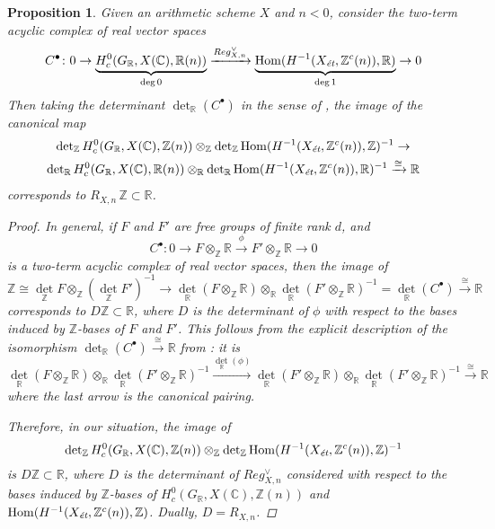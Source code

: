 \documentclass[draft]{article}
\DeclareMathOperator{\Hom}{Hom}
\newcommand{\CC}{\mathbb{C}}
\newcommand{\RR}{\mathbb{R}}
\newcommand{\ZZ}{\mathbb{Z}}
\renewcommand{\det}{\operatorname{det}}
\newcommand{\et}{\text{\it \'{e}t}}
\theoremstyle{myplain}
\newtheorem{proposition}[theorem]{Proposition}
\theoremstyle{mydefinition}
\numberwithin{equation}{section}
\begin{document}
\begin{proposition}
  \label{prop:trivialization-of-free-part}
  Given an arithmetic scheme $X$ and $n < 0$, consider the two-term acyclic
  complex of real vector spaces
  \[ C^\bullet\colon
    0 \to
    \underbrace{H^0_c (G_\RR, X(\CC), \RR(n))}_{\deg 0}
    \xrightarrow{Reg_{X,n}^\vee}
    \underbrace{\Hom (H^{-1} (X_\et, \ZZ^c (n)), \RR)}_{\deg 1}
    \to 0 \]
  Then taking the determinant $\det_\RR (C^\bullet)$ in the sense of
  \cite{Knudsen-Mumford-1976}, the image of the canonical map
  \begin{multline*}
    \det_\ZZ H^0_c (G_\RR, X(\CC), \ZZ(n)) \otimes_\ZZ
    \det_\ZZ \Hom (H^{-1} (X_\et, \ZZ^c (n)), \ZZ)^{-1} \to \\
    \det_\RR H^0_c (G_\RR, X(\CC), \RR (n)) \otimes_\RR
    \det_\RR \Hom (H^{-1} (X_\et, \ZZ^c (n)), \RR)^{-1}
    \xrightarrow{\cong} \RR
  \end{multline*}
  corresponds to $R_{X,n}\,\ZZ \subset \RR$.

  \begin{proof}
    In general, if $F$ and $F'$ are free groups of finite rank $d$, and
    $$C^\bullet\colon 0 \to F\otimes_\ZZ \RR \xrightarrow{\phi} F'\otimes_\ZZ \RR \to 0$$
    is a two-term acyclic complex of real vector spaces, then the image of
    \[ \ZZ \cong \det_\ZZ F \otimes_\ZZ (\det_\ZZ F')^{-1} \to
      \det_\RR (F\otimes_\ZZ \RR) \otimes_\RR \det_\RR (F' \otimes_\ZZ \RR)^{-1}
      = \det_\RR (C^\bullet) \xrightarrow{\cong} \RR \]
    corresponds to $D\ZZ \subset \RR$, where $D$ is the determinant of $\phi$ with
    respect to the bases induced by $\ZZ$-bases of $F$ and $F'$.
    This follows from the explicit description of the isomorphism
    $\det_\RR (C^\bullet) \xrightarrow{\cong} \RR$ from
    \cite[p.\,33]{Knudsen-Mumford-1976}: it is
    \[ \det_\RR (F \otimes_\ZZ \RR) \otimes_\RR
      \det_\RR (F'\otimes_\ZZ \RR)^{-1} \xrightarrow{\det_\RR (\phi)}
      \det_\RR (F' \otimes_\ZZ \RR) \otimes_\RR
      \det_\RR (F' \otimes_\ZZ \RR)^{-1} \xrightarrow{\cong} \RR \]
    where the last arrow is the canonical pairing.

    Therefore, in our situation, the image of
    \[ \det_\ZZ H^0_c (G_\RR, X(\CC), \ZZ(n)) \otimes_\ZZ
      \det_\ZZ \Hom (H^{-1} (X_\et, \ZZ^c (n)), \ZZ)^{-1} \]
    is $D \ZZ \subset \RR$, where $D$ is the determinant of $Reg_{X,n}^\vee$
    considered with respect to the bases induced by $\ZZ$-bases of
    $H^0_c (G_\RR, X(\CC), \ZZ(n))$ and
    $\Hom (H^{-1} (X_\et, \ZZ^c (n)), \ZZ)$. Dually, $D = R_{X,n}$.
  \end{proof}
\end{proposition}
\end{document}
